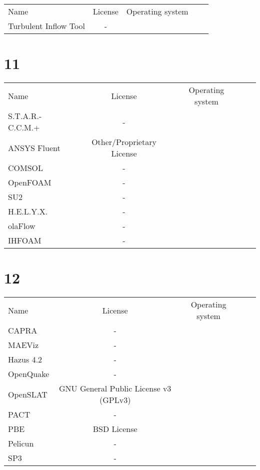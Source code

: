 \begin{table}[]
    \centering
    \begin{tabular}{l|cccc}
    \toprule
    Name &  License & Operating system\\
        Turbulent Inflow Tool & - &\\

    \bottomrule
    \end{tabular}
    \end{table}

\section{11}

\begin{table}[]
    \centering
    \begin{tabular}{l|cccc}
    \toprule
    Name &  License & Operating system\\
        S.T.A.R.-C.C.M.+ & - &\\
        ANSYS Fluent &  Other/Proprietary License &\\
        COMSOL & - &\\
        OpenFOAM & - &\\
        SU2 & - &\\
        H.E.L.Y.X. & - &\\
        olaFlow & - &\\
        IHFOAM & - &\\

    \bottomrule
    \end{tabular}
    \end{table}

\section{12}

\begin{table}[]
    \centering
    \begin{tabular}{l|cccc}
    \toprule
    Name &  License & Operating system\\
        CAPRA & - &\\
        MAEViz & - &\\
        Hazus 4.2 & - &\\
        OpenQuake & - &\\
        OpenSLAT &  GNU General Public License v3 (GPLv3) &\\
        PACT & - &\\
        PBE &  BSD License &\\
        Pelicun & - &\\
        SP3 & - &\\

    \bottomrule
    \end{tabular}
    \end{table}

